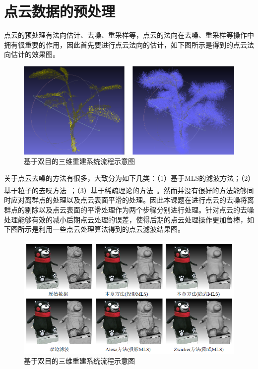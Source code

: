 \documentclass[10pt]{article}
\newcommand{\upcite}[1]{\textsuperscript{\textsuperscript{\cite{#1}}}}
\begin{document}
\section{点云数据的预处理}
点云的预处理有法向估计、去噪、重采样等，点云的法向在去噪、重采样等操作中拥有很重要的作用，因此首先要进行点云法向的估计，如下图所示是得到的点云法向估计的效果图。
\begin{figure}[H]
\begin{center}
\includegraphics[scale=0.3]{normal-estimation.png}
\caption{基于双目的三维重建系统流程示意图}
\end{center}
\end{figure}
关于点云去噪的方法有很多，大致分为如下几类：（1）基于MLS的滤波方法；（2）基于粒子的去噪方法\upcite{filter01}$^{^{-}}$\upcite{filter05}；（3）基于稀疏理论的方法\upcite{filter06}$^{^{-}}$\upcite{filter10}。然而并没有很好的方法能够同时应对离群点的处理以及点云表面平滑的处理。因此本课题在进行点云的去噪将离群点的剔除以及点云表面的平滑处理作为两个步骤分别进行处理。针对点云的去噪处理能够有效的减小后期点云处理的误差，使得后期的点云处理操作更加鲁棒，如下图所示是利用一些点云处理算法得到的点云滤波结果图。
\begin{figure}[H]
\begin{center}
\includegraphics[scale=0.3]{point-cloud-denoising.png}
\caption{基于双目的三维重建系统流程示意图}
\end{center}
\end{figure}
\end{document}
